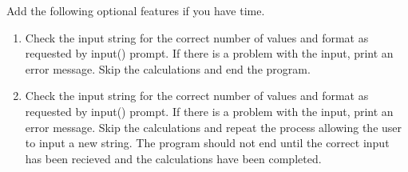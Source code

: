 \documentclass[12pt]{article}
\begin{document}
\begin{description}[labelindent=1cm]
\begin{enumerate}
        \end{enumerate}

        \item [\textbf{\underline{Optional Advanced Features:}}] Add the following optional features if you have time. 
        \begin{enumerate}
            \item Check the input string for the correct number of values and format as requested by input() prompt. If there is a problem with the input, print an error message. Skip the calculations and end the program.
            \item Check the input string for the correct number of values and format as requested by input() prompt. If there is a problem with the input, print an error message. Skip the calculations and repeat the process allowing the user to input a new string. The program should not end until the correct input has been recieved and the calculations have been completed. 
        \end{enumerate} 
       




        \item[\textbf{\underline{Example Code:}}] \hfill \vspace{0mm}


\end{description}
\end{document}

